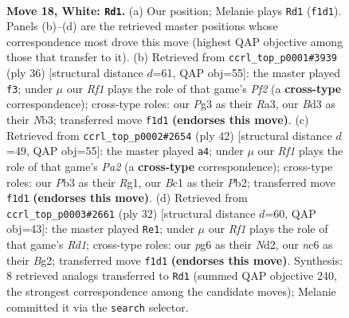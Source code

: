 \documentclass[11pt]{article}
\begin{document}
\clearpage

\begin{figure}[p]\centering
\begin{subfigure}{0.46\textwidth}\centering
\resizebox{\linewidth}{!}{%
\newchessgame
\chessboard[
  setfen={r1b1kbr1/2p5/1pn3p1/p4p1p/3P4/1PPB1NP1/R4P1P/2B2RK1 w q - 6 18},
  showmover=false,
  pgfstyle=straightmove, color=movearrow, markmove={f1-d1}
]}
\caption{}
\end{subfigure}\hfill
\begin{subfigure}{0.46\textwidth}\centering
\resizebox{\linewidth}{!}{%
\newchessgame
\chessboard[
  setfen={r1b2rk1/1p1n1p2/2p3p1/p2p4/P2P3p/RN1BP3/1P3PPP/2R3K1 w - - 2 19},
  showmover=false,
  pgfstyle=straightmove, color=movearrow, markmove={f2-f3}
]}
\caption{}
\end{subfigure}
\\[4pt]
\begin{subfigure}{0.46\textwidth}\centering
\resizebox{\linewidth}{!}{%
\newchessgame
\chessboard[
  setfen={r1b4r/2k1npp1/p2pp3/1p4Pn/4PP2/2N1B3/PPP5/2KR1BR1 w - - 4 22},
  showmover=false,
  pgfstyle=straightmove, color=movearrow, markmove={a2-a4}
]}
\caption{}
\end{subfigure}\hfill
\begin{subfigure}{0.46\textwidth}\centering
\resizebox{\linewidth}{!}{%
\newchessgame
\chessboard[
  setfen={2bk3r/1p3ppp/r1pp1n2/8/PpPP4/1P4P1/3N1PBP/R2R2K1 w - - 2 17},
  showmover=false,
  pgfstyle=straightmove, color=movearrow, markmove={d1-e1}
]}
\caption{}
\end{subfigure}
\caption{\textbf{Move 18, White: \texttt{Rd1}.} (a) Our position; Melanie plays \texttt{Rd1} (\texttt{f1d1}). Panels (b)--(d) are the retrieved master positions whose correspondence most drove this move (highest QAP objective among those that transfer to it). (b) Retrieved from \texttt{ccrl\_top\_p0001\#3939} (ply 36) [structural distance $d$=61, QAP obj=55]: the master played \texttt{f3}; under $\mu$ our \emph{Rf1} plays the role of that game's \emph{Pf2} (a \textbf{cross-type} correspondence); cross-type roles: our \emph{P}g3 as their \emph{R}a3, our \emph{B}d3 as their \emph{N}b3; transferred move \texttt{f1d1} \textbf{(endorses this move)}. (c) Retrieved from \texttt{ccrl\_top\_p0002\#2654} (ply 42) [structural distance $d$=49, QAP obj=55]: the master played \texttt{a4}; under $\mu$ our \emph{Rf1} plays the role of that game's \emph{Pa2} (a \textbf{cross-type} correspondence); cross-type roles: our \emph{P}b3 as their \emph{R}g1, our \emph{B}c1 as their \emph{P}b2; transferred move \texttt{f1d1} \textbf{(endorses this move)}. (d) Retrieved from \texttt{ccrl\_top\_p0003\#2661} (ply 32) [structural distance $d$=60, QAP obj=43]: the master played \texttt{Re1}; under $\mu$ our \emph{Rf1} plays the role of that game's \emph{Rd1}; cross-type roles: our \emph{p}g6 as their \emph{N}d2, our \emph{n}c6 as their \emph{B}g2; transferred move \texttt{f1d1} \textbf{(endorses this move)}. Synthesis: 8 retrieved analogs transferred to \texttt{Rd1} (summed QAP objective 240, the strongest correspondence among the candidate moves); Melanie committed it via the \texttt{search} selector.}
\label{fig:thought-m34}
\end{figure}
\end{document}
